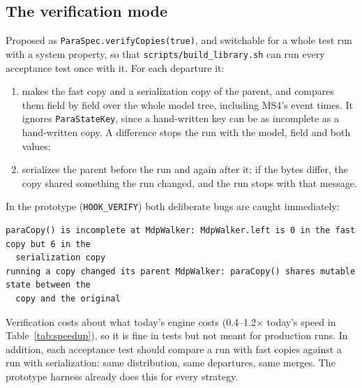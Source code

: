 \documentclass[11pt]{article}
\newcommand{\code}[1]{\texttt{#1}}
\begin{document}
\subsection{The verification mode}
Proposed as \code{ParaSpec.verifyCopies(true)}, and switchable for a whole test run with a system property, so that
\code{scripts/build\_library.sh} can run every acceptance test once with it. For each departure it:
\begin{enumerate}
\item makes the fast copy and a serialization copy of the parent, and compares them field by field over the whole
  model tree, including MS4's event times. It ignores \code{ParaStateKey}, since a hand-written key can be as
  incomplete as a hand-written copy. A difference stops the run with the model, field and both values;
\item serializes the parent before the run and again after it; if the bytes differ, the copy shared something the run
  changed, and the run stops with that message.
\end{enumerate}
In the prototype (\code{HOOK\_VERIFY}) both deliberate bugs are caught immediately:
\begin{lstlisting}[language={}]
paraCopy() is incomplete at MdpWalker: MdpWalker.left is 0 in the fast copy but 6 in the
  serialization copy
running a copy changed its parent MdpWalker: paraCopy() shares mutable state between the
  copy and the original
\end{lstlisting}
Verification costs about what today's engine costs (0.4--1.2$\times$ today's speed in Table~\ref{tab:speedup}), so it
is fine in tests but not meant for production runs. In addition, each acceptance test should compare a run with fast
copies against a run with serialization: same distribution, same departures, same merges. The prototype harness
already does this for every strategy.
\end{document}

